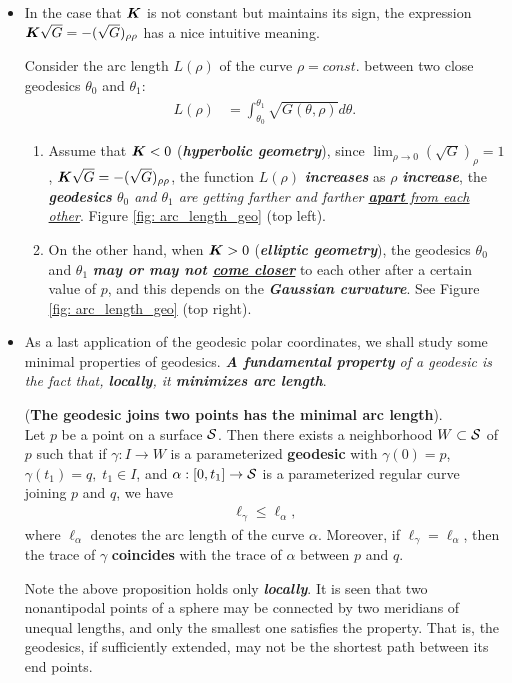 \documentclass[11pt]{article}
\begin{document}
\begin{itemize}
\item In the case that $\boldsymbol{K}$ is not constant but maintains its sign, the expression $\boldsymbol{K}\sqrt{G}=-(\sqrt{G})_{\rho\rho}$ has a nice intuitive meaning.

Consider the arc length $L(\rho)$ of the curve $\rho = const.$ between two close geodesics $\theta_{0}$ and $\theta_{1}$: 
\begin{align*}
L(\rho) &= \int_{\theta_{0}}^{\theta_{1}}\sqrt{G(\theta, \rho)}d\theta.
\end{align*}

\begin{enumerate}
\item Assume that $\boldsymbol{K}<0$ (\emph{\textbf{hyperbolic geometry}}), since $\lim_{\rho\rightarrow 0}(\sqrt{G})_{\rho} = 1$, $\boldsymbol{K}\sqrt{G} = -(\sqrt{G})_{\rho\rho}$, the function $L(\rho)$ \emph{\textbf{increases}} as $\rho$ \emph{\textbf{increase}}, the \emph{\textbf{geodesics} $\theta_{0}$ and $\theta_{1}$ are getting farther and farther \underline{\textbf{apart} from each other}}.  Figure \ref{fig: arc_length_geo} (top left).

\item On the other hand, when $\boldsymbol{K}>0$ (\emph{\textbf{elliptic geometry}}), the geodesics $\theta_{0}$ and $\theta_{1}$ \emph{\textbf{may or may not \underline{come closer}}} to each other after a certain value of $p$, and this depends on the \emph{\textbf{Gaussian curvature}}. See Figure \ref{fig: arc_length_geo} (top right).
\end{enumerate}


\item As a last application of the geodesic polar coordinates, we shall study some minimal properties of geodesics. \emph{\textbf{A fundamental property} of a geodesic is the fact that, \textbf{locally}, it \textbf{minimizes arc length}}. 

\begin{proposition}\label{prop: geo_minimal_arc}
(\textbf{The geodesic joins two points has the minimal arc length}).\\ 
Let $p$ be a point on a surface ${\mathcal S}$. Then there exists a neighborhood $W\subset {\mathcal S}$ of $p$ such that if $\gamma: I\rightarrow W$ is  a parameterized \textbf{geodesic} with $\gamma(0) = p$, $\gamma(t_{1}) = q,\; t_{1}\in I$, and $\alpha: [0,t_{1}]\rightarrow {\mathcal S}$ is a parameterized regular curve joining $p$ and $q$, we have
\begin{align*}
\ell_{\gamma} \le \ell_{\alpha},
\end{align*}
where $\ell_{\alpha}$ denotes the arc length of the curve $\alpha$. Moreover, if $\ell_{\gamma} = \ell_{\alpha}$, then the trace of $\gamma$ \textbf{coincides} with the trace of $\alpha$ between $p$ and $q$.
\end{proposition}
Note the above proposition holds only \emph{\textbf{locally}}. It is seen that two nonantipodal points of a sphere may be connected by two meridians of unequal lengths, and only the smallest one satisfies the property. That is, the geodesics, if sufficiently extended, may not be the shortest path between its end points. 


\end{itemize}
\end{document}
